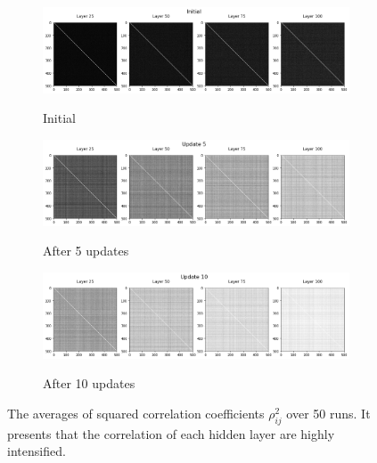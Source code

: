 \begin{figure}
\centering
\newcommand{\myWidth}{.8\textwidth}
\begin{subfigure}{\myWidth}
  \centering
  \caption{Initial}
  \includegraphics[width=1.0\linewidth,trim={0 0 0 0.8cm},clip]{"Hard-tanh[0]"}
  \label{fig:sec5_sim2_a}
\end{subfigure}%

\begin{subfigure}{\myWidth}
  \centering
  \caption{After 5 updates}
  \includegraphics[width=1.0\linewidth,trim={0 0 0 0.8cm},clip]{"Hard-tanh[5]"}
  \label{fig:sec5_sim2_b}
\end{subfigure}%

\begin{subfigure}{\myWidth}
  \centering
  \caption{After 10 updates}
  \includegraphics[width=1.0\linewidth,trim={0 0 0 0.8cm},clip]{"Hard-tanh[10]"}
  \label{fig:sec5_sim2_c}
\end{subfigure}%
\caption{The averages of squared correlation coefficients $\rho_{ij}^2$ over 50 runs. It presents that the correlation of each hidden layer are highly intensified.}
\label{fig:sec5_sim2}
\end{figure}